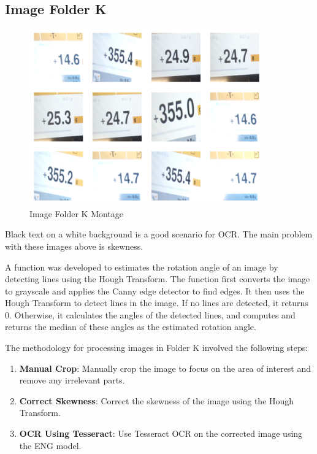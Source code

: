 \newpage
\subsection{Image Folder K}

\begin{figure}[ht]
    \centering
    \includegraphics[width=0.9\textwidth]{Figures/EDA_Charts/11/montage.png}
    \caption[Image Folder K Montage]{Image Folder K Montage}
    \label{fig:Image Folder K Montage}
\end{figure}

Black text on a white background is a good scenario for OCR. The main problem with these images above is skewness.

A function was developed to estimates the rotation angle of an image by detecting lines using the Hough Transform. \cite{mukhopadhyaySurveyHoughTransform2015} The function first converts the image to grayscale and applies the Canny edge detector to find edges. It then uses the Hough Transform to detect lines in the image. If no lines are detected, it returns 0. Otherwise, it calculates the angles of the detected lines, and computes and returns the median of these angles as the estimated rotation angle.

The methodology for processing images in Folder K involved the following steps:

\begin{enumerate}
    \item \textbf{Manual Crop}: Manually crop the image to focus on the area of interest and remove any irrelevant parts.
    \item \textbf{Correct Skewness}: Correct the skewness of the image using the Hough Transform.
    \item \textbf{OCR Using Tesseract}: Use Tesseract OCR on the corrected image using the ENG model.

\end{enumerate}

